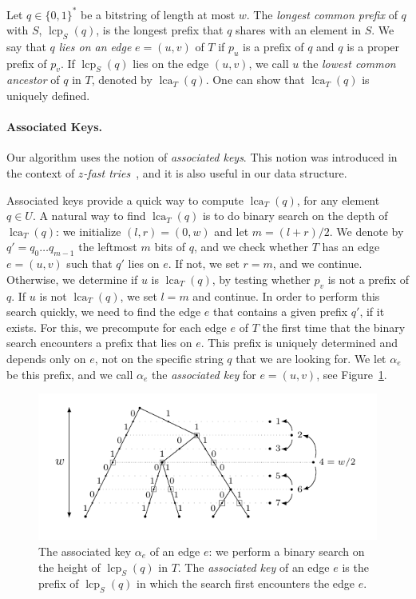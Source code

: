 \documentclass[a4paper,11pt]{article}
\newcommand{\?}{\mskip1.5mu}
\DeclareMathOperator{\lcp}{lcp} %
\DeclareMathOperator{\lca}{lca} %
\begin{document}
Let $q \in \{0,1\}^*$ be a bitstring of length at most $w$.
The \emph{longest common prefix} of $q$ with $S$, $\lcp_S(q)$,
is the longest prefix that $q$ shares with an element 
in $S$. We say that $q$ \emph{lies on an edge}
$e = (u, v)$ of $T$ if $p_u$ is a prefix of $q$ and
$q$ is a proper prefix of $p_v$. If $\lcp_S(q)$
lies on the 
edge $(u,v)$, we call $u$ the \emph{lowest common
ancestor} of $q$ in $T$, denoted by
$\lca_T(q)$. One can show that $\lca_T(q)$ is uniquely
defined.

\paragraph{Associated Keys.}
Our algorithm uses the notion of
\emph{associated keys}. This notion
was introduced in the context of 
\emph{$z$-fast tries}~\cite{BelazzouguiBoVi10,Ruzic09},
and it is also useful in our data structure.

Associated keys provide a quick way to compute $\lca_T(q)$,
for any element $q \in U$.
A natural way to find $\lca_T(q)$ is
to do binary search on the depth of $\lca_T(q)$:
we initialize $(l,r) = (0,w)$ and let 
$m = (l+r)/2$. We denote by $q' = q_0\dots q_{m-1}$ 
the leftmost $m$ bits of $q$, and we check whether
$T$ has an edge $e = (u,v)$ such that $q'$ lies on $e$.
If not, we set $r = m$, and we continue.
Otherwise, we determine if $u$ is $\lca_T(q)$, by
testing whether $p_v$ is not a prefix of $q$.
If $u$ is not $\lca_T(q)$, we set $l = m$ and continue.
In order to perform this search quickly,
we need to find the edge $e$ that
contains a given prefix $q'$, if it exists. For this,
we precompute for each edge $e$ of $T$
the first time that the binary search
encounters a prefix that lies on $e$. This
prefix is uniquely determined and depends only on 
$e$, not on the specific string $q$ that we are looking 
for. We let $\alpha_e$ be
this prefix, and we call $\alpha_e$ the \emph{associated key}
for $e = (u,v)$, see Figure~\ref{fig:binsearch}. 
\begin{figure}
\centering
\includegraphics{binsearch_assoc_key_main}
\caption{The associated key $\alpha_e$ of an edge $e$:
we perform a binary search on the height of
$\lcp_S(q)$ in $T$. The \emph{associated key}
of an edge $e$ is the prefix of $\lcp_S(q)$ in which the
search first encounters the edge $e$. }
\label{fig:binsearch}
\end{figure}
\end{document}
